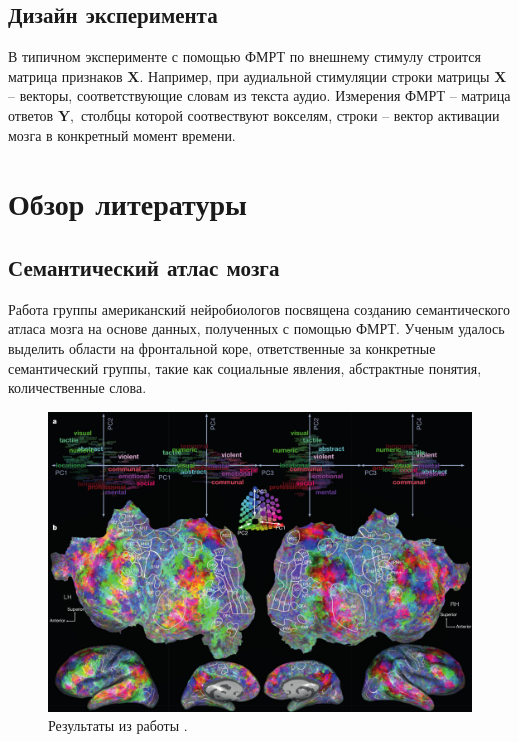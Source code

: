 \documentclass[pdftex,ptm,12pt,a4paper]{report}
\theoremstyle{definition}
\begin{document}
\section{Дизайн эксперимента}

В типичном эксперименте с помощью ФМРТ по внешнему стимулу строится матрица признаков $\textbf{X}.$ Например, при аудиальной стимуляции строки матрицы $\textbf{X}$ -- векторы, соответствующие словам из текста аудио. Измерения ФМРТ -- матрица ответов $\textbf{Y},$ столбцы которой соотвествуют вокселям, строки -- вектор активации мозга в конкретный момент времени.


\chapter{Обзор литературы}
\section{Семантический атлас мозга}\label{complex}


Работа \cite{huth2016natural} группы американский нейробиологов посвящена созданию семантического атласа мозга на основе данных, полученных с помощью ФМРТ. Ученым удалось выделить области на фронтальной коре, ответственные за конкретные семантический группы, такие как социальные явления, абстрактные понятия, количественные слова. 

\begin{figure}[h]
\includegraphics[scale=0.4]{images/galant_results.png}
\centering
\caption{Результаты из работы \cite{huth2016natural}.}
\label{huth_result}
\end{figure}
\end{document}
